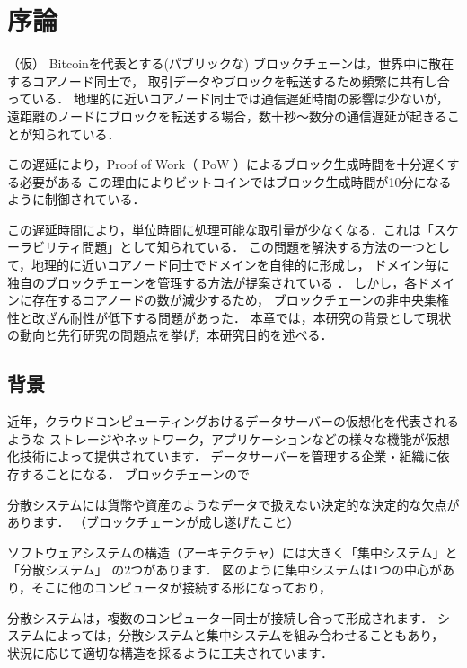 \documentclass[a4paper,12pt]{jsarticle}
\begin{document}

\section{序論}

（仮）
Bitcoinを代表とする(パブリックな) ブロックチェーンは，世界中に散在するコアノード同士で，
取引データやブロックを転送するため頻繁に共有し合っている．
地理的に近いコアノード同士では通信遅延時間の影響は少ないが，
遠距離のノードにブロックを転送する場合，数十秒〜数分の通信遅延が起きることが知られている．

この遅延により，Proof of Work（ PoW ）によるブロック生成時間を十分遅くする必要がある
この理由によりビットコインではブロック生成時間が10分になるように制御されている．

この遅延時間により，単位時間に処理可能な取引量が少なくなる．これは「スケーラビリティ問題」として知られている． 
この問題を解決する方法の一つとして，地理的に近いコアノード同士でドメインを自律的に形成し，
ドメイン毎に独自のブロックチェーンを管理する方法が提案されている \cite{fujihara1}\cite{fujihara2}．
しかし，各ドメインに存在するコアノードの数が減少するため，
ブロックチェーンの非中央集権性と改ざん耐性が低下する問題があった．
本章では，本研究の背景として現状の動向と先行研究の問題点を挙げ，本研究目的を述べる．


\subsection{背景}
近年，クラウドコンピューティングおけるデータサーバーの仮想化を代表されるような
ストレージやネットワーク，アプリケーションなどの様々な機能が仮想化技術によって提供されています．
データサーバーを管理する企業・組織に依存することになる．
ブロックチェーンので

分散システムには貨幣や資産のようなデータで扱えない決定的な決定的な欠点があります．
（ブロックチェーンが成し遂げたこと）

ソフトウェアシステムの構造（アーキテクチャ）には大きく「集中システム」と「分散システム」
の2つがあります．
図のように集中システムは1つの中心があり，そこに他のコンピュータが接続する形になっており，

分散システムは，複数のコンピューター同士が接続し合って形成されます．
システムによっては，分散システムと集中システムを組み合わせることもあり，
状況に応じて適切な構造を採るように工夫されています．
\end{document}
